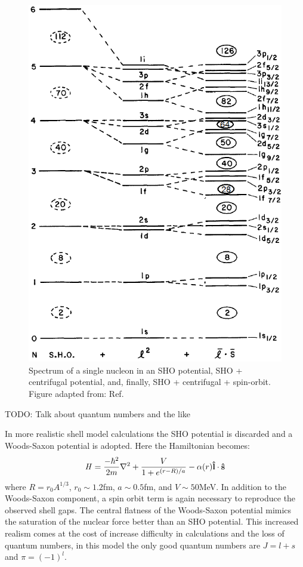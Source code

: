 \begin{figure}
\label{fig:chp2-shell-model}
\centerline{\includegraphics[height=0.45\textheight]{./img/c2/shell_model.png}}
	\caption{Spectrum of a single nucleon in an SHO potential, SHO + centrifugal potential, and, finally, SHO + centrifugal + spin-orbit. Figure adapted from: Ref.\cite{casten}}
\end{figure}

TODO: Talk about quantum numbers and the like

In more realistic shell model calculations the SHO potential is discarded and a Woods-Saxon potential is adopted. Here the Hamiltonian becomes:
\begin{equation}
\label{eqn:chp2-sm-ws-hamil}
\mathbf{\mathit{H}} = \frac{-\hbar^2}{2m}\nabla^2 + \frac{V}{1+e^{(r-R)/a}} - \alpha(r)\boldsymbol{\hat{\textbf{l}}}\cdot\boldsymbol{\hat{\textbf{s}}}
\end{equation}
where $R=r_0A^{1/3}$, $r_0\sim1.2$fm, $a\sim0.5$fm, and $V\sim50$MeV. In addition to the Woods-Saxon component, a spin orbit term is again necessary to reproduce the observed shell gaps. The central flatness of the Woods-Saxon potential mimics the saturation of the nuclear force better than an SHO potential. This increased realism comes at the cost of increase difficulty in calculations and the loss of quantum numbers, in this model the only good quantum numbers are $J=\mathit{l}+\mathit{s}$ and $\pi = (-1)^\mathit{l}$.

